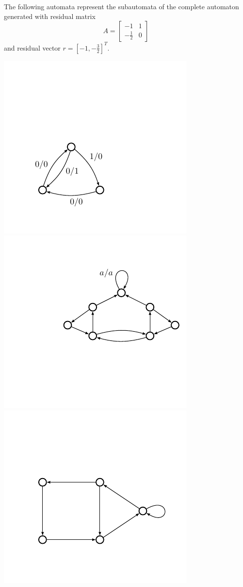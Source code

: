 \documentclass[11pt]{article}
\begin{document}
\begin{example}
The following automata represent the subautomata of
the complete automaton generated with residual matrix
\[
  A = \begin{bmatrix}
    -1 &1\\
    -\frac{1}{2} & 0
    \end{bmatrix}
\]
and residual vector $r = [-1, -\frac{3}{2}]^T$.

\vspace{-5em}
\begin{center}
\includegraphics[scale=0.5]{figures/a32}
\includegraphics[scale=0.5]{figures/bowtie}
\includegraphics[scale=0.5]{figures/pent}

\end{center}
\end{example}
\end{document}

